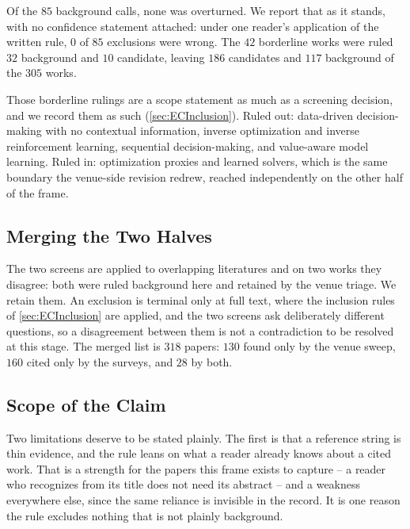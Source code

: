 Of the \(85\) background calls, none was overturned. We report that as it stands, with no confidence
statement attached: under one reader's application of the written rule, \(0\) of \(85\) exclusions
were wrong. The \(42\) borderline works were ruled \(32\) background and \(10\) candidate, leaving
\(186\) candidates and \(117\) background of the \(305\) works.

Those borderline rulings are a scope statement as much as a screening decision, and we record them
as such (\cref{sec:ECInclusion}). Ruled out: data-driven decision-making with no contextual
information, inverse optimization and inverse reinforcement learning, sequential decision-making,
and value-aware model learning. Ruled in: optimization proxies and learned solvers, which is the
same boundary the venue-side revision redrew, reached independently on the other half of the frame.

\subsection{Merging the Two Halves}

The two screens are applied to overlapping literatures and on two works they disagree: both were
ruled background here and retained by the venue triage. We retain them. An exclusion is terminal
only at full text, where the inclusion rules of \cref{sec:ECInclusion} are applied, and the two
screens ask deliberately different questions, so a disagreement between them is not a contradiction
to be resolved at this stage. The merged list is \(318\) papers: \(130\) found only by the venue
sweep, \(160\) cited only by the surveys, and \(28\) by both.

\subsection{Scope of the Claim}

Two limitations deserve to be stated plainly. The first is that a reference string is thin evidence,
and the rule leans on what a reader already knows about a cited work. That is a strength for the
papers this frame exists to capture -- a reader who recognizes \citet{berthet2020learning} from its
title does not need its abstract -- and a weakness everywhere else, since the same reliance is
invisible in the record. It is one reason the rule excludes nothing that is not plainly background.

